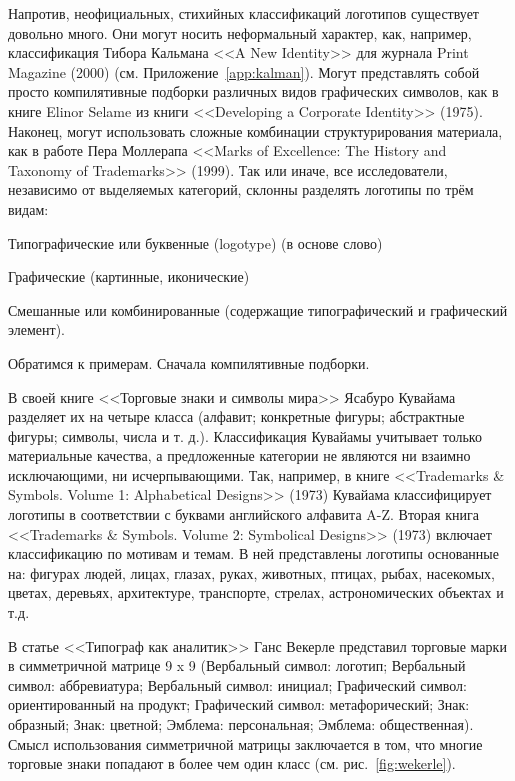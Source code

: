 Напротив, неофициальных, стихийных классификаций логотипов существует довольно много. Они могут
носить неформальный характер, как, например, классификация Тибора Кальмана <<A New Identity>> для
журнала Print Magazine (2000) (см. Приложение~\ref{app:kalman}). Могут представлять собой
просто компилятивные подборки различных
видов графических символов, как в книге Elinor Selame из книги <<Developing a Corporate Identity>>
(1975). Наконец, могут использовать сложные комбинации структурирования материала, как в работе Пера
Моллерапа <<Marks of Excellence: The History and Taxonomy of Trademarks>> (1999). Так или иначе, все
исследователи, независимо от выделяемых категорий, склонны разделять логотипы по трём видам:
\begin{enumerate*}[label=\arabic*)]
\item Типографические или буквенные (logotype) (в основе слово)
\item Графические (картинные, иконические)
\item Смешанные или комбинированные (содержащие типографический и графический элемент).
\end{enumerate*}

Обратимся к примерам. Сначала компилятивные подборки.

В своей книге <<Торговые знаки и символы мира>> Ясабуро Кувайама разделяет их на четыре класса
(алфавит; конкретные фигуры; абстрактные фигуры; символы, числа и т. д.). Классификация Кувайамы
учитывает только материальные качества, а предложенные категории не являются ни взаимно
исключающими, ни исчерпывающими. Так, например, в книге <<Trademarks \& Symbols. Volume 1:
Alphabetical Designs>> (1973) Кувайама классифицирует логотипы в соответствии с буквами английского
алфавита A-Z. \autocite[][5]{kuwayama1973alphabetical}
Вторая книга <<Trademarks \& Symbols. Volume 2: Symbolical Designs>> (1973) включает
классификацию по мотивам и темам. \autocite[][5]{kuwayama1973trademarks}
В ней представлены логотипы основанные на: фигурах людей, лицах, глазах, руках, животных, птицах, рыбах, насекомых, цветах, деревьях, архитектуре, транспорте, стрелах, астрономических объектах и т.д.

В статье <<Типограф как аналитик>> Ганс Векерле\autocite{weckerle1968typographer} представил торговые марки в
симметричной матрице 9 x 9 (Вербальный символ: логотип; Вербальный символ: аббревиатура; Вербальный
символ: инициал; Графический символ: ориентированный на продукт; Графический символ: метафорический;
Знак: образный; Знак: цветной; Эмблема: персональная; Эмблема: общественная). Смысл использования
симметричной матрицы заключается в том, что многие торговые знаки попадают в более чем один
класс (см. рис.~\ref{fig:wekerle}).

